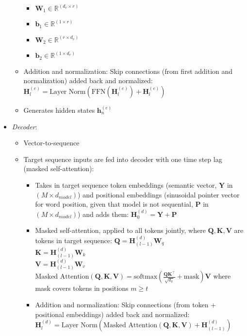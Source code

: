 \begin{itemize}
\begin{itemize}
        \begin{itemize}
            \item $\boldsymbol{W}_1 \in \mathbb{R}^{(d_v \times r)}$
            \item $\boldsymbol{b}_1 \in \mathbb{R}^{(1 \times r)}$
            \item $\boldsymbol{W}_2 \in \mathbb{R}^{(r \times d_v)}$
            \item $\boldsymbol{b}_2 \in \mathbb{R}^{(1 \times d_v)}$
        \end{itemize}
        \item Addition and normalization: Skip connections (from first addition and normalization) added back and normalized: $\boldsymbol{H}_l^{(e)} = \text{Layer Norm}(\text{FFN}(\boldsymbol{H}_l^{(e)}) + \boldsymbol{H}_l^{(e)})$
        \item Generates hidden states $\boldsymbol{h}_n^{(e)}$
    \end{itemize}
    \item \emph{Decoder}: 
    \begin{itemize}
        \item Vector-to-sequence
        \item Target sequence inputs are fed into decoder with one time step lag (masked self-attention): 
        \begin{itemize}
            \item Takes in target sequence token embeddings (semantic vector, $\boldsymbol{Y}$ in $(M \times d_{model})$) and positional embeddings (sinusoidal pointer vector for word position, given that model is not sequential, $\boldsymbol{P}$ in $(M \times d_{model})$) and adds them:
            $\boldsymbol{H}_0^{(d)} = \boldsymbol{Y} + \boldsymbol{P}$
            \item Masked self-attention, applied to all tokens jointly, where $\boldsymbol{Q,K,V}$ are tokens in target sequence:
            $\boldsymbol{Q} = \boldsymbol{H}_{(l-1)}^{(d)} \boldsymbol{W}_q$\\
            $\boldsymbol{K} = \boldsymbol{H}_{(l-1)}^{(d)} \boldsymbol{W}_k$\\
            $\boldsymbol{V} = \boldsymbol{H}_{(l-1)}^{(d)} \boldsymbol{W}_v$\\
            $\text{Masked Attention}(\boldsymbol{Q}, \boldsymbol{K}, \boldsymbol{V}) = \text{softmax}\left(\frac{\boldsymbol{Q} \boldsymbol{K}^\top}{\sqrt{d_k}} + \textrm{mask}\right) \boldsymbol{V}$ where mask covers tokens in positions $m \geq t$
            \item Addition and normalization: Skip connections (from token + positional embeddings) added back and normalized: $\boldsymbol{H}_l^{(d)} = \text{Layer Norm}(\text{Masked Attention}(\boldsymbol{Q}, \boldsymbol{K}, \boldsymbol{V}) + \boldsymbol{H}_{(l-1)}^{(d)})$

\end{itemize}
\end{itemize}
\end{itemize}
